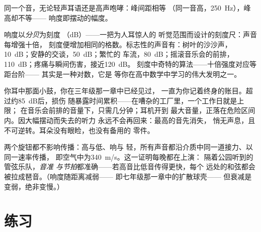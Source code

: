 \begin{omfigure}

{\small 同一个音，无论轻声耳语还是高声咆哮：峰间距相等
（同一音高，\qty{250}{Hz}），峰高却不等——
响度即摆动的幅度。}
\end{omfigure}

\begin{example}[分贝刻度]\label{ex:g8:sound-pitch-loudness:decibels}
响度以\emph{分贝}为刻度
（\unit{dB}）——一把为人耳惊人的
听觉范围而设计的刻度尺：声音每增强十倍，
刻度便增加相同的格数。标志性的声音有：树叶的沙沙声，
\qty{10}{dB}；安静的交谈，\qty{50}{dB}；繁忙的
车流，\qty{80}{dB}；摇滚音乐会的前排，
\qty{110}{dB}；疼痛与瞬间伤害，接近\qty{120}{dB}。
刻度中奇特的算法——十倍强度对应等距台阶——
其实是一种对数，它是
等你在高中数学中学习的伟大发明之一。
\end{example}

\begin{remark}[耳朵的听力账本]\label{rem:g8:sound-pitch-loudness:earsafety}
你耳中那面小鼓，你在三年级那一章中已经见过，
一直为你记着终身的账目。超过约\qty{85}{dB}后，损伤
随暴露时间累积——在嘈杂的工厂里，一个工作日就是上限；
在音乐会前排的音量下，只需几分钟；耳机开到
最大音量，正落在危险区间内。因大幅摆动而失去的听力
永远不会再回来：最高的音先消失，
悄无声息，且不可逆转。耳朵没有眼睑，也没有备用的
零件。
\end{remark}

\begin{example}[速度不受任何旋钮影响]\label{ex:g8:sound-pitch-loudness:speed}
两个旋钮都不影响传播：高与低、响与
轻，所有声音都沿介质中同一道接力、以同一速率传播，
即空气中为\qty{340}{m/s}。这一证明每晚都在上演：
隔着公园听到的管弦乐队，\emph{音准
与节拍}都准确——若高音比低音传得更快，每个
远处的和弦都会被拉成琶音。（响度随距离减弱——
即七年级那一章中的扩散球壳——
但衰减是变弱，绝非变慢。）
\end{example}

\section{练习}

